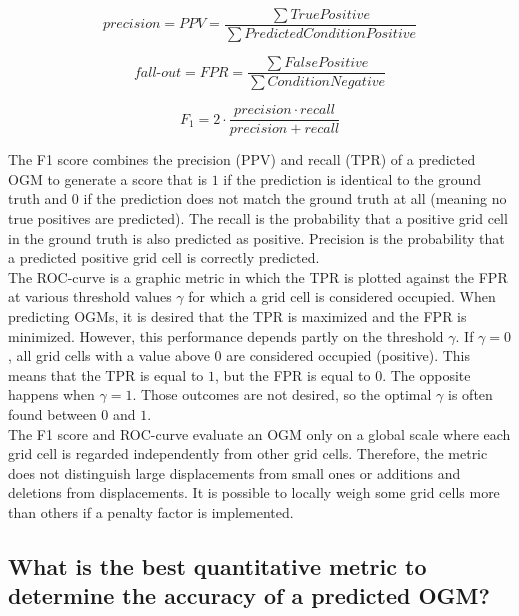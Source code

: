 \begin{equation} \label{eq:precision}
	precision = PPV = \frac{\sum True Positive}{\sum Predicted Condition Positive}
\end{equation}

\begin{equation} \label{eq:fallout}
	fall\text{-}out = FPR = \frac{\sum False Positive}{\sum Condition Negative}
\end{equation}

\begin{equation} \label{eq:f1score}
	F_1 = 2 \cdot \frac{precision \cdot recall}{precision + recall}
\end{equation}

The F1 score combines the precision (\gls{PPV}) and recall (\gls{TPR}) of a predicted \gls{OGM} to generate a score that is $1$ if the prediction is identical to the ground truth and $0$ if the prediction does not match the ground truth at all (meaning no true positives are predicted). The recall is the probability that a positive grid cell in the ground truth is also predicted as positive. Precision is the probability that a predicted positive grid cell is correctly predicted. \\

The \gls{ROC}-curve is a graphic metric in which the \gls{TPR} is plotted against the \gls{FPR} at various threshold values $\gamma$ for which a grid cell is considered occupied. When predicting \glspl{OGM}, it is desired that the \gls{TPR} is maximized and the \gls{FPR} is minimized. However, this performance depends partly on the threshold $\gamma$. If $\gamma = 0$, all grid cells with a value above $0$ are considered occupied (positive). This means that the \gls{TPR} is equal to $1$, but the \gls{FPR} is equal to $0$. The opposite happens when $\gamma = 1$. Those outcomes are not desired, so the optimal $\gamma$ is often found between $0$ and $1$.  \\

The F1 score and \gls{ROC}-curve evaluate an \gls{OGM} only on a global scale where each grid cell is regarded independently from other grid cells. Therefore, the metric does not distinguish large displacements from small ones or additions and deletions from displacements. It is possible to locally weigh some grid cells more than others if a penalty factor is implemented.



\subsection{What is the best quantitative metric to determine the accuracy of a predicted OGM?} \label{subsec:con_met}

